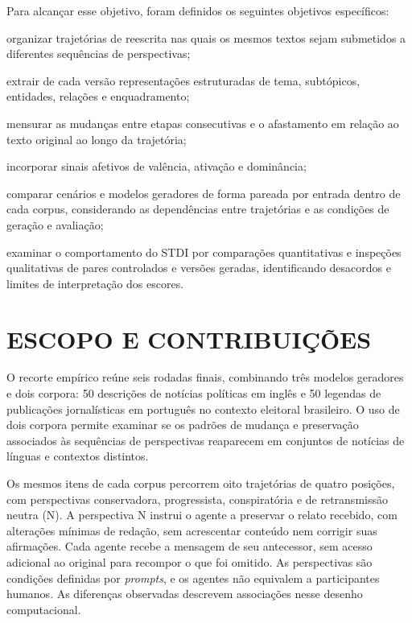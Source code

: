 Para alcançar esse objetivo, foram definidos os seguintes objetivos específicos:

\begin{alineas}
  \item organizar trajetórias de reescrita nas quais os mesmos textos sejam submetidos a diferentes sequências de perspectivas;
  \item extrair de cada versão representações estruturadas de tema, subtópicos, entidades, relações e enquadramento;
  \item mensurar as mudanças entre etapas consecutivas e o afastamento em relação ao texto original ao longo da trajetória;
  \item incorporar sinais afetivos de valência, ativação e dominância;
  \item comparar cenários e modelos geradores de forma pareada por entrada dentro de cada corpus, considerando as dependências entre trajetórias e as condições de geração e avaliação;
  \item examinar o comportamento do STDI por comparações quantitativas e inspeções qualitativas de pares controlados e versões geradas, identificando desacordos e limites de interpretação dos escores.
\end{alineas}

\section{ESCOPO E CONTRIBUIÇÕES}
\label{sec:escopo-contribuicoes}

O recorte empírico reúne seis rodadas finais, combinando três modelos geradores e dois corpora: 50 descrições de notícias políticas em inglês e 50 legendas de publicações jornalísticas em português no contexto eleitoral brasileiro. O uso de dois corpora permite examinar se os padrões de mudança e preservação associados às sequências de perspectivas reaparecem em conjuntos de notícias de línguas e contextos distintos.

Os mesmos itens de cada corpus percorrem oito trajetórias de quatro posições, com perspectivas conservadora, progressista, conspiratória e de retransmissão neutra (N). A perspectiva N instrui o agente a preservar o relato recebido, com alterações mínimas de redação, sem acrescentar conteúdo nem corrigir suas afirmações. Cada agente recebe a mensagem de seu antecessor, sem acesso adicional ao original para recompor o que foi omitido. As perspectivas são condições definidas por \textit{prompts}, e os agentes não equivalem a participantes humanos. As diferenças observadas descrevem associações nesse desenho computacional.


